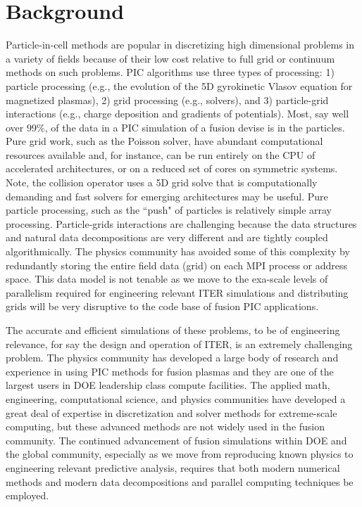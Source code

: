 \documentclass[review]{siamart}
\begin{document}
\section{Background}

Particle-in-cell methods are popular in discretizing high dimensional problems in a variety of fields because of their low cost relative to full grid or continuum methods on such problems.
PIC algorithms use three types of processing: 1) particle processing (e.g., the evolution of the 5D gyrokinetic Vlasov equation for magnetized plasmas), 2) grid processing (e.g., solvers), and 3) particle-grid interactions (e.g., charge deposition and gradients of potentials).
Most, say well over $99\%$, of the data in a PIC simulation of a fusion devise is in the particles.
Pure grid work, such as the Poisson solver, have abundant computational resources available and, for instance, can be run entirely on the CPU of accelerated architectures, or on a reduced set of cores on symmetric systems.
Note, the collision operator uses a 5D grid solve that is computationally demanding and fast solvers for emerging architectures may be useful.
Pure particle processing, such as the ``push" of particles is relatively simple array processing.
Particle-grids interactions are challenging because the data structures and natural data decompositions are very different and are tightly coupled algorithmically.
The physics community has avoided some of this complexity by redundantly storing the entire field data (grid) on each MPI process or address space.
This data model is not tenable as we move to the exa-scale levels of parallelism required for engineering relevant ITER simulations and distributing grids will be very disruptive to the code base of fusion PIC applications.

The accurate and efficient simulations of these problems, to be of engineering relevance, for say the design and operation of ITER, is an extremely challenging problem.
The physics community has developed a large body of research and experience in using PIC methods for fusion plasmas and they are one of the largest users in DOE leadership class compute facilities.
The applied math, engineering, computational science, and physics communities have developed a great deal of expertise in discretization and solver methods for extreme-scale computing, but these advanced methods are not widely used in the fusion community.
The continued advancement of fusion simulations within DOE and the global community, especially as we move from reproducing known physics to engineering relevant predictive analysis, requires that both modern numerical methods and modern data decompositions and parallel computing techniques be employed.
\end{document}

